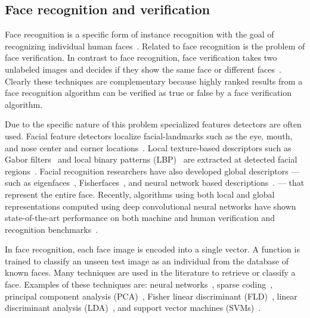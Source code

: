     \subsection{Face recognition and verification}
        Face recognition is a specific form of instance recognition with the goal of recognizing individual human
        faces~\cite{zhao_face_2003, huang_labeled_2007}. Related to face recognition is the problem of face
        verification. In contrast to face recognition, face verification takes two unlabeled images and decides if
        they show the same face or different faces~\cite{taigman_deepface_2014}. Clearly these techniques are
        complementary because highly ranked results from a face recognition algorithm can be verified as true or
        false by a face verification algorithm.

        Due to the specific nature of this problem specialized features detectors are often used. Facial feature
        detectors localize facial-landmarks such as the eye, mouth, and nose center and corner
        locations~\cite{dantone_real_time_2012, berg_tom_vs_pete_2012}. Local texture-based descriptors such as Gabor
        filters~\cite{liu_gabor_2002, zhang_histogram_2007, shen_review_2006} and local binary patterns
        (LBP)~\cite{ahonen_face_2006, chen_blessing_2013} are extracted at detected facial
        regions~\cite{belhumeur_localizing_2011}. Facial recognition researchers have also developed global
        descriptors --- such as eigenfaces~\cite{turk_eigenfaces_1991},
        Fisherfaces~\cite{belhumeur_eigenfaces_1997}, and neural network based
        descriptions~\cite{lawrence_face_1997, taigman_deepface_2014}. --- that represent the entire face.
        Recently, algorithms using both local and global representations computed using deep convolutional neural
        networks have shown state-of-the-art performance on both machine and human verification and recognition
        benchmarks~\cite{taigman_deepface_2014}.

        In face recognition, each face image is encoded into a single vector. A function is trained to classify an
        unseen test image as an individual from the database of known faces. Many techniques are used in the
        literature to retrieve or classify a face. Examples of these techniques are: neural
        networks~\cite{turk_eigenfaces_1991, taigman_deepface_2014}, sparse coding~\cite{wright_robust_2009,
        jiang_label_2013}, principal component analysis (PCA)~\cite{craw_face_1992}, Fisher linear discriminant
        (FLD)~\cite{liu_robust_2000}, linear discriminant analysis (LDA)~\cite{lu_face_2003}, and support vector
        machines (SVMs)~\cite{phillips_support_1998, levy_svm_minus_2013}.

